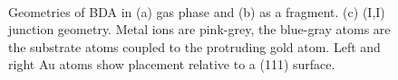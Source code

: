 \documentclass[aip,jcp,a4paper,reprint,floatfix,superscriptaddress]{revtex4-1}
\begin{document}
\begin{figure}
\hfill
{}\\
\caption{Geometries of BDA in (a) gas phase and (b) as a fragment. (c) (I,I) junction geometry. Metal ions are pink-grey, the blue-gray atoms are the substrate atoms coupled to the protruding gold atom. Left and right Au atoms show placement relative to a (111) surface.} \label{fg:3BDAgeometries}
\end{figure}
\end{document}
